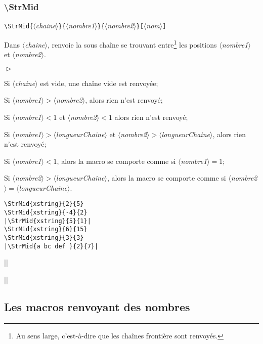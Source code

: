 \documentclass[a4paper,10pt]{article}
\newcommand\guill[1]{\og{}#1\fg{}}
\newcommand\argu[1]{$\langle$\textit{#1}$\rangle$}
\newcommand\ARGU[1]{\texttt{\color{black}\{}\argu{#1}\texttt{\color{black}\}}}
\newcommand\arguC[1]{\texttt{\color{black}[}\argu{#1}\texttt{\color{black}]}}
\newenvironment{Conditions}[1][1cm]%
{\begin{list}%
	{$\vartriangleright$}%
	{\setlength{\leftmargin}{#1}
	 \setlength{\itemsep}{0pt}
	 \setlength{\parsep}{0pt}
	 \setlength{\topsep}{2ptplus3ptminus2pt}
	}}%
{\end{list}}
\newcommand\styleexemple{\small\vskip4pt}
\newcommand\verbinline{\lstinline[basicstyle=\normalsize\ttfamily]}
\begin{document}
\subsubsection{\ttfamily\textbackslash StrMid}
\verbinline|\StrMid|\ARGU{chaine}\ARGU{nombre1}\ARGU{nombre2}\arguC{nom}
\smallskip

Dans \argu{chaine}, renvoie la sous chaîne se trouvant entre\footnote{Au sens large, c'est-à-dire que les chaînes \guill{frontière} sont renvoyés.} les positions \argu{nombre1} et \argu{nombre2}.\medskip

\begin{Conditions}
	\item Si \argu{chaine} est vide, une chaîne vide est renvoyée;
	\item Si \argu{nombre1}${}>{}$\argu{nombre2}, alors rien n'est renvoyé;
	\item Si \argu{nombre1}${}<1$ et \argu{nombre2}${}<1$ alors rien n'est renvoyé;
	\item Si \argu{nombre1}${}>{}$\argu{longueurChaine} et \argu{nombre2}${}>{}$\argu{longueurChaine}, alors rien n'est renvoyé;
	\item Si \argu{nombre1}${}<1$, alors la macro se comporte comme si \argu{nombre1}${}=1$;
	\item Si \argu{nombre2}${}>{}$\argu{longueurChaine}, alors la macro se comporte comme si \argu{nombre2}${}={}$\argu{longueurChaine}.
\end{Conditions}

\begin{minipage}[t]{0.65\linewidth}
\begin{lstlisting}
\StrMid{xstring}{2}{5}
\StrMid{xstring}{-4}{2}
|\StrMid{xstring}{5}{1}|
\StrMid{xstring}{6}{15}
\StrMid{xstring}{3}{3}
|\StrMid{a bc def }{2}{7}|
\end{lstlisting}%
\end{minipage}\hfill
\begin{minipage}[t]{0.35\linewidth}
	\styleexemple
	\par
	\par
	||\par
	\par
	\par
	||
\end{minipage}%

\subsection{Les macros renvoyant des nombres}
\end{document}
